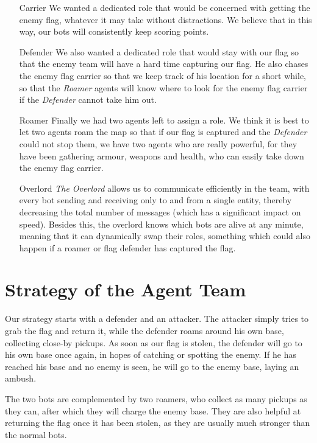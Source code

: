 \begin{enumerate}
\item[Carrier] We wanted a dedicated role that would be concerned with getting the enemy flag, whatever it may take without distractions. We believe that in this way, our bots will consistently keep scoring points.

\item[Defender] We also wanted a dedicated role that would stay with our flag so that the enemy team will have a hard time capturing our flag. He also chases the enemy flag carrier so that we keep track of his location for a short while, so that the \emph{Roamer} agents will know where to look for the enemy flag carrier if the \emph{Defender} cannot take him out.

\item[Roamer] Finally we had two agents left to assign a role. We think it is best to let two agents roam the map so that if our flag is captured and the \emph{Defender} could not stop them, we have two agents who are really powerful, for they have been gathering armour, weapons and health, who can easily take down the enemy flag carrier.

\item[Overlord] \emph{The Overlord} allows us to communicate efficiently in the team, with every bot sending and receiving only to and from a single entity, thereby decreasing the total number of messages (which has a significant impact on speed). Besides this, the overlord knows which bots are alive at any minute, meaning that it can dynamically swap their roles, something which could also happen if a roamer or flag defender has captured the flag.
\end{enumerate} 

\section{Strategy of the Agent Team}
Our strategy starts with a defender and an attacker. The attacker simply tries to grab the flag and return it, while the defender roams around his own base, collecting close-by pickups. As soon as our flag is stolen, the defender will go to his own base once again, in hopes of catching or spotting the enemy. If he has reached his base and no enemy is seen, he will go to the enemy base, laying an ambush.

The two bots are complemented by two roamers, who collect as many pickups as they can, after which they will charge the enemy base. They are also helpful at returning the flag once it has been stolen, as they are usually much stronger than the normal bots.

